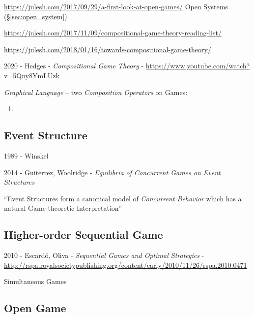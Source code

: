 \url{https://julesh.com/2017/09/29/a-first-look-at-open-games/} \fist Open
Systems (\S\ref{sec:open_system})

\url{https://julesh.com/2017/11/09/compositional-game-theory-reading-list/}


\url{https://julesh.com/2018/01/16/towards-compositional-game-theory/}

\asterism

2020 - Hedges - \emph{Compositional Game Theory} -
\url{https://www.youtube.com/watch?v=5Qny8YmLUzk}

\emph{Graphical Language} -- two \emph{Composition Operators} on Games:

\begin{enumerate}
  \item 
\end{enumerate}



\subsection{Event Structure}\label{sec:event_structure}

1989 - Winskel

2014 - Guiterrez, Woolridge - \emph{Equilibria of Concurrent Games on Event
  Structures}

``Event Structures form a canonical model of \emph{Concurrent Behavior} which
has a natural Game-theoretic Interpretation''



\subsection{Higher-order Sequential Game}\label{sec:higherorder_sequential_game}

2010 - Escard\'o, Oliva - \emph{Sequential Games and Optimal Strategies} -
\url{http://rspa.royalsocietypublishing.org/content/early/2010/11/26/rspa.2010.0471}

Simultaneous Games



\subsection{Open Game}\label{sec:open_game}

